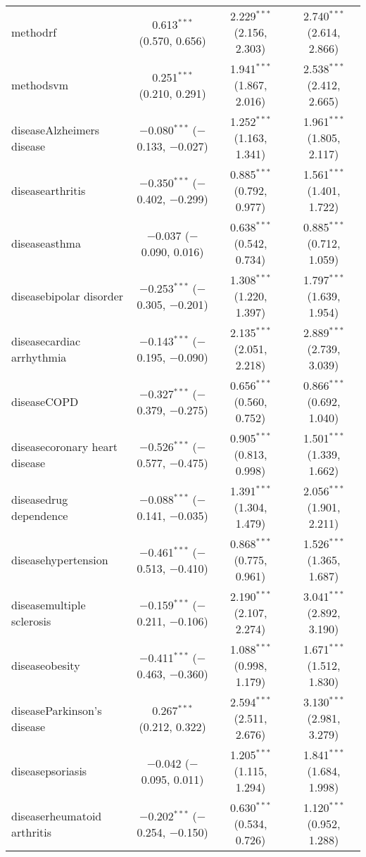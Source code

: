 \begin{table}[!htbp]
\begin{tabular}{@{\extracolsep{5pt}}lccc}
  methodrf & 0.613$^{***}$ (0.570, 0.656) & 2.229$^{***}$ (2.156, 2.303) & 2.740$^{***}$ (2.614, 2.866) \\ 
  methodsvm & 0.251$^{***}$ (0.210, 0.291) & 1.941$^{***}$ (1.867, 2.016) & 2.538$^{***}$ (2.412, 2.665) \\ 
  diseaseAlzheimers disease & $-$0.080$^{***}$ ($-$0.133, $-$0.027) & 1.252$^{***}$ (1.163, 1.341) & 1.961$^{***}$ (1.805, 2.117) \\ 
  diseasearthritis & $-$0.350$^{***}$ ($-$0.402, $-$0.299) & 0.885$^{***}$ (0.792, 0.977) & 1.561$^{***}$ (1.401, 1.722) \\ 
  diseaseasthma & $-$0.037 ($-$0.090, 0.016) & 0.638$^{***}$ (0.542, 0.734) & 0.885$^{***}$ (0.712, 1.059) \\ 
  diseasebipolar disorder & $-$0.253$^{***}$ ($-$0.305, $-$0.201) & 1.308$^{***}$ (1.220, 1.397) & 1.797$^{***}$ (1.639, 1.954) \\ 
  diseasecardiac arrhythmia & $-$0.143$^{***}$ ($-$0.195, $-$0.090) & 2.135$^{***}$ (2.051, 2.218) & 2.889$^{***}$ (2.739, 3.039) \\ 
  diseaseCOPD & $-$0.327$^{***}$ ($-$0.379, $-$0.275) & 0.656$^{***}$ (0.560, 0.752) & 0.866$^{***}$ (0.692, 1.040) \\ 
  diseasecoronary heart disease & $-$0.526$^{***}$ ($-$0.577, $-$0.475) & 0.905$^{***}$ (0.813, 0.998) & 1.501$^{***}$ (1.339, 1.662) \\ 
  diseasedrug dependence & $-$0.088$^{***}$ ($-$0.141, $-$0.035) & 1.391$^{***}$ (1.304, 1.479) & 2.056$^{***}$ (1.901, 2.211) \\ 
  diseasehypertension & $-$0.461$^{***}$ ($-$0.513, $-$0.410) & 0.868$^{***}$ (0.775, 0.961) & 1.526$^{***}$ (1.365, 1.687) \\ 
  diseasemultiple sclerosis & $-$0.159$^{***}$ ($-$0.211, $-$0.106) & 2.190$^{***}$ (2.107, 2.274) & 3.041$^{***}$ (2.892, 3.190) \\ 
  diseaseobesity & $-$0.411$^{***}$ ($-$0.463, $-$0.360) & 1.088$^{***}$ (0.998, 1.179) & 1.671$^{***}$ (1.512, 1.830) \\ 
  diseaseParkinson's disease & 0.267$^{***}$ (0.212, 0.322) & 2.594$^{***}$ (2.511, 2.676) & 3.130$^{***}$ (2.981, 3.279) \\ 
  diseasepsoriasis & $-$0.042 ($-$0.095, 0.011) & 1.205$^{***}$ (1.115, 1.294) & 1.841$^{***}$ (1.684, 1.998) \\ 
  diseaserheumatoid arthritis & $-$0.202$^{***}$ ($-$0.254, $-$0.150) & 0.630$^{***}$ (0.534, 0.726) & 1.120$^{***}$ (0.952, 1.288) \\ 

\end{tabular}
\end{table}
